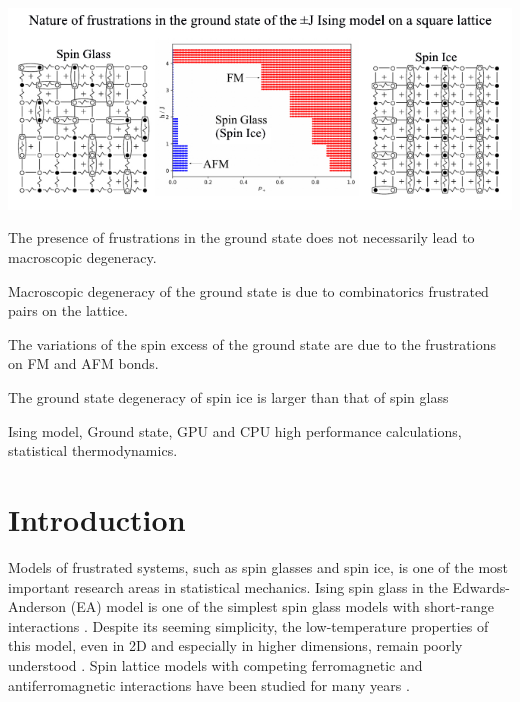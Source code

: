 \documentclass[preprint,12pt]{elsarticle}
\begin{document}
\begin{frontmatter}
\begin{abstract}
		\end{abstract}
		
		\begin{graphicalabstract}
		\includegraphics[width=1.2\linewidth]{Graphical Abstract.pdf}
		\end{graphicalabstract}
		
		
		\begin{highlights}  
			\item The presence of frustrations in the ground state does not necessarily lead to macroscopic degeneracy.
			\item Macroscopic degeneracy of the ground state is due to combinatorics frustrated pairs on the lattice.
			\item The variations of the spin excess of the ground state are due to the frustrations on FM and AFM bonds. 
			\item The ground state degeneracy of spin ice is larger than that of spin glass
		\end{highlights}  
		
		
		\begin{keyword}
			Ising model, Ground state, GPU and CPU high performance calculations, statistical thermodynamics.
		\end{keyword}
		
		
	\end{frontmatter}
	
	\linenumbers
	
	\newpage
	\tableofcontents
	
	\newpage
	\section{Introduction}
	
	Models of frustrated systems, such as spin glasses and spin ice, is one of the most important research areas in statistical mechanics. Ising spin glass in the Edwards-Anderson (EA) model is one of the simplest spin glass models with short-range interactions \cite{edwards1975theory}. Despite its seeming simplicity, the low-temperature properties of this model, even in 2D and especially in higher dimensions, remain poorly understood \cite{pal1996ground, hartmann2011ground, newman2022ground}. Spin lattice models with competing ferromagnetic and antiferromagnetic interactions have been studied for many years \cite{binder1986spin, mezard1987spin, lebrecht2004plaquette, valdes2012j, lebrecht2015j, fan2023searching}.
	
\end{document}
